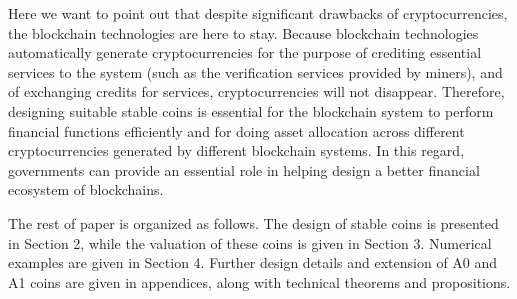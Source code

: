 \documentclass[draft, noinfoline]{ectaart}
\numberwithin{equation}{section}
\theoremstyle{plain}
\begin{document}
Here we want to point out that despite significant drawbacks of cryptocurrencies, the blockchain technologies are here to stay. Because blockchain technologies automatically generate cryptocurrencies for the purpose of crediting essential services to the system (such as the verification services provided by miners), and of exchanging credits for services, cryptocurrencies will not disappear. Therefore, designing suitable stable coins is essential for the blockchain system to perform financial functions efficiently and for doing asset allocation across different cryptocurrencies generated by different blockchain systems. In this regard, governments can provide an essential role in helping design a better financial ecosystem of blockchains.

The rest of paper is organized as follows. The design of stable coins is presented in Section 2, while the valuation of these coins is given in Section 3. Numerical examples are given in Section 4. Further design details and extension of A0 and A1 coins are given in appendices, along with technical theorems and propositions.







\end{document}
